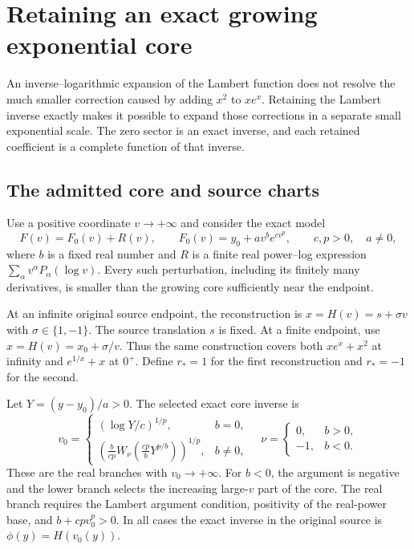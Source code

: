 \section{Retaining an exact growing exponential core}
\label{sec:exponential-core-perturbation}

An inverse--logarithmic expansion of the Lambert function does not resolve
the much smaller correction caused by adding $x^2$ to $xe^x$. Retaining
the Lambert inverse exactly makes it possible to expand those corrections
in a separate small exponential scale. The zero sector is an exact inverse,
and each retained coefficient is a complete function of that inverse.

\subsection{The admitted core and source charts}

Use a positive coordinate $v\to+\infty$ and consider the exact model
\begin{equation}
 F(v)=F_0(v)+R(v),\qquad
 F_0(v)=y_0+a v^b e^{c v^p},
 \qquad c,p>0,\quad a\ne0,
 \label{eq:exponential-core-forward}
\end{equation}
where $b$ is a fixed real number and $R$ is a finite real power--log
expression $\sum_\alpha v^\alpha P_\alpha(\log v)$.
Every such perturbation, including its finitely many derivatives, is
smaller than the growing core sufficiently near the endpoint.

At an infinite original source endpoint, the reconstruction is
$x=H(v)=s+\sigma v$ with $\sigma\in\{1,-1\}$. The source translation $s$ is fixed. At a finite endpoint, use $x=H(v)=x_0+\sigma/v$.
Thus the same construction covers both $xe^x+x^2$ at infinity and
$e^{1/x}+x$ at $0^+$. Define $r_*=1$ for the first reconstruction and
$r_*=-1$ for the second.

Let $Y=(y-y_0)/a>0$. The selected exact core inverse is
\begin{equation}
 v_0=
 \begin{cases}
 (\log Y/c)^{1/p},&b=0,\\[0.3em]
 \displaystyle
 \left(\frac{b}{cp}
 W_\nu\!\left(\frac{cp}{b}Y^{p/b}\right)\right)^{1/p},&b\ne0,
 \end{cases}
 \quad
 \nu=\begin{cases}0,&b>0,\\-1,&b<0.\end{cases}
 \label{eq:exponential-core-exact-inverse}
\end{equation}
These are the real branches with $v_0\to+\infty$.
For $b<0$, the argument is negative and the lower branch selects the
increasing large-$v$ part of the core. The real branch requires the Lambert argument condition, positivity
of the real-power base, and
$b+cpv_0^p>0$. In all cases the exact inverse in the original source is
$\phi(y)=H(v_0(y))$.

